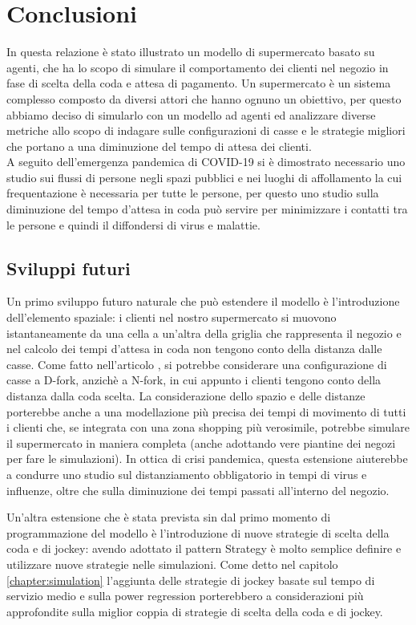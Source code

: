 \chapter{Conclusioni}

In questa relazione è stato illustrato un modello di supermercato basato su agenti, che ha lo scopo di simulare il comportamento dei clienti nel negozio in fase di scelta della coda e attesa di pagamento. Un supermercato è un sistema complesso composto da diversi attori che hanno ognuno un obiettivo, per questo abbiamo deciso di simularlo con un modello ad agenti ed analizzare diverse metriche allo scopo di indagare sulle configurazioni di casse e le strategie migliori che portano a una diminuzione del tempo di attesa dei clienti. \\
A seguito dell'emergenza pandemica di COVID-19 si è dimostrato necessario uno studio sui flussi di persone negli spazi pubblici e nei luoghi di affollamento la cui frequentazione è necessaria per tutte le persone, per questo uno studio sulla diminuzione del tempo d'attesa in coda può servire per minimizzare i contatti tra le persone e quindi il diffondersi di virus e malattie.

\section{Sviluppi futuri}

Un primo sviluppo futuro naturale che può estendere il modello è l'introduzione dell'elemento spaziale: i clienti nel nostro supermercato si muovono istantaneamente da una cella a un'altra della griglia che rappresenta il negozio e nel calcolo dei tempi d'attesa in coda non tengono conto della distanza dalle casse. Come fatto nell'articolo \cite{yanagisawa2011methods}, si potrebbe considerare una configurazione di casse a D-fork, anzichè a N-fork, in cui appunto i clienti tengono conto della distanza dalla coda scelta. La considerazione dello spazio e delle distanze porterebbe anche a una modellazione più precisa dei tempi di movimento di tutti i clienti che, se integrata con una zona shopping più verosimile, potrebbe simulare il supermercato in maniera completa (anche adottando vere piantine dei negozi per fare le simulazioni). In ottica di crisi pandemica, questa estensione aiuterebbe a condurre uno studio sul distanziamento obbligatorio in tempi di virus e influenze, oltre che sulla diminuzione dei tempi passati all'interno del negozio.

Un'altra estensione che è stata prevista sin dal primo momento di programmazione del modello è l'introduzione di nuove strategie di scelta della coda e di jockey: avendo adottato il pattern Strategy è molto semplice definire e utilizzare nuove strategie nelle simulazioni. Come detto nel capitolo \ref{chapter:simulation} l'aggiunta delle strategie di jockey basate sul tempo di servizio medio e sulla power regression porterebbero a considerazioni più approfondite sulla miglior coppia di strategie di scelta della coda e di jockey.

